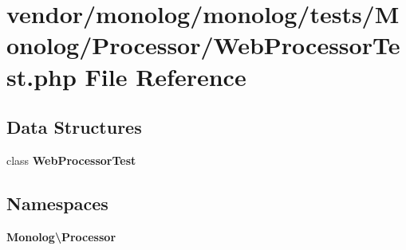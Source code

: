 \section{vendor/monolog/monolog/tests/\+Monolog/\+Processor/\+Web\+Processor\+Test.php File Reference}
\label{_web_processor_test_8php}
\subsection*{Data Structures}
\begin{DoxyCompactItemize}
\item 
class {\bf Web\+Processor\+Test}
\end{DoxyCompactItemize}
\subsection*{Namespaces}
\begin{DoxyCompactItemize}
\item 
 {\bf Monolog\textbackslash{}\+Processor}
\end{DoxyCompactItemize}

